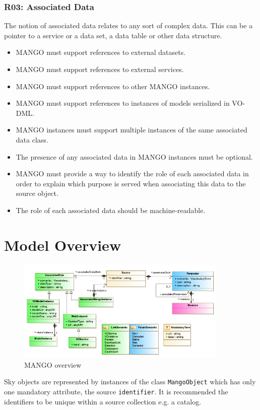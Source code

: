 \documentclass[11pt,a4paper]{ivoa}
\begin{document}
\subsubsection{R03: Associated Data}
The notion of associated data relates to any sort of complex data. This can be a pointer to a service or a data set, a data table or  other data structure.
\begin{itemize}
    \item MANGO must support references to external datasets.
    \item MANGO must support references to external services.
    \item MANGO must support references to other MANGO instances.
    \item MANGO  must support references to instances of models serialized in VO-DML.
    \item MANGO instances must support multiple instances of the same associated data class.
    \item The presence of any associated data in MANGO instances must be optional.
    \item MANGO must provide a way to identify the role of each associated data in order to explain which purpose is served when associating this data to the source object.
    \item The role of each associated data should be machine-readable.
 \end{itemize}

\section{Model Overview}

\begin{figure}
\includegraphics[width=0.9\textwidth]{../model/mangoOverview.png}
\caption{MANGO overview}
\label{fig:overview}
\end{figure}


Sky objects are represented by instances of the class \texttt{MangoObject} which has only one mandatory attribute, the source \texttt{identifier}.
It is recommended the identifiers to be unique within a source collection e.g. a catalog.
\end{document}
